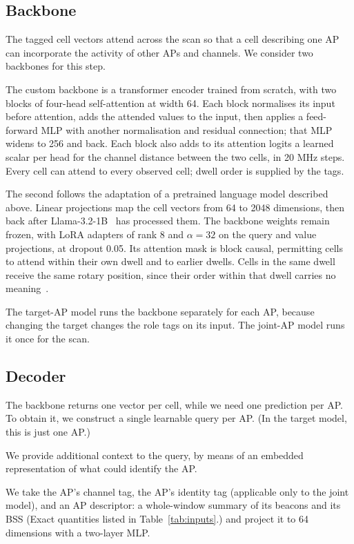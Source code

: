 \documentclass[conference]{IEEEtran}
\begin{document}
\subsection{Backbone}
\label{sec:backbone}

The tagged cell vectors attend across the scan so that a cell describing one
AP can incorporate the activity of other APs and channels. We consider two
backbones for this step.

The custom backbone is a transformer encoder trained from scratch, with two
blocks of four-head self-attention at width 64. Each block normalises its input before
attention, adds the attended values to the input, then applies a feed-forward
MLP with another normalisation and residual connection; that MLP widens to 256
and back. Each block also adds to its attention logits a learned scalar per
head for the channel distance between the two cells, in 20 MHz steps. Every
cell can attend to every observed cell; dwell order is supplied by the tags.

The second follows the adaptation of a pretrained language model described
above. Linear projections map the cell vectors from 64 to 2048 dimensions,
then back after Llama-3.2-1B~\cite{meta2024llama32} has processed them. The backbone weights remain
frozen, with LoRA adapters of rank 8 and $\alpha = 32$ on the query and value
projections, at dropout 0.05. Its
attention mask is block causal, permitting cells to attend within their own dwell 
and to earlier dwells. Cells in the same dwell receive the same rotary position, 
since their order within that dwell carries no meaning~\cite{su2024roformer}.

The target-AP model runs the backbone separately for each AP, because changing
the target changes the role tags on its input. The joint-AP model runs it once
for the scan.

\subsection{Decoder}
\label{sec:decoder}

The backbone returns one vector per cell, while we need one prediction per AP.
To obtain it, we construct a single learnable query per AP. (In the target model, 
this is just one AP.)

We provide additional context to the query, by means of an embedded representation
of what could identify the AP. 

We take the AP's channel tag, the AP's identity tag (applicable only to the joint model), 
and an AP descriptor: a whole-window summary of its beacons and its BSS (Exact quantities listed 
in Table~\ref{tab:inputs}.) and project it to 64 dimensions with a two-layer MLP. 
\end{document}
